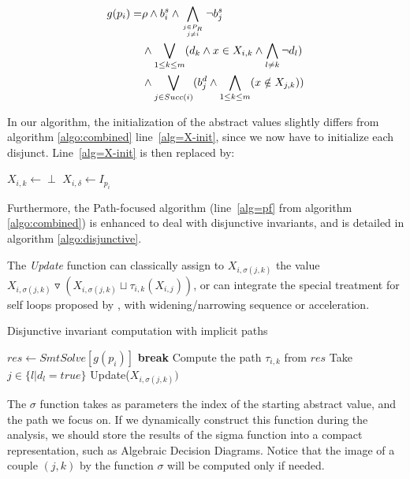 \documentclass[preprint]{sigplanconf}
\newcommand{\widening}{\mathop{\triangledown}}
\begin{document}
\begin{eqnarray*}
g(p_i) = & \rho \wedge b_i^s \wedge 
\displaystyle\bigwedge_{j \in P_R \atop j \neq i} \neg b_j^s  \\
 & \wedge 
\displaystyle\bigvee_{1 \leq k \leq m} (d_k \wedge x \in X_{i,k} \wedge \bigwedge_{l \neq k}
\neg d_l) \\
 & \wedge
\displaystyle\bigvee_{j \in Succ(i)} 
(b_j^d \wedge \bigwedge_{1 \leq k \leq m} (x \notin X_{j,k}))
\end{eqnarray*}

In our algorithm, the initialization of the abstract values slightly differs from
algorithm \ref{algo:combined} line~\ref{alg=X-init}, since we now have to
initialize each disjunct. Line~\ref{alg=X-init} is then replaced by:
\begin{algorithm}[!h]
\begin{algorithmic}[1] 
	\STATE $X_{i,k} \gets \perp$
\ENDFOR
\STATE $X_{i,\delta} \gets I_{p_i}$
\end{algorithmic}
\end{algorithm}

Furthermore, the Path-focused algorithm (line~\ref{alg=pf} from algorithm
\ref{algo:combined}) is enhanced to deal with disjunctive invariants, and
is detailed in algorithm \ref{algo:disjunctive}.

The \emph{Update} function can classically assign to $X_{i,\sigma(j,k)}$ the
value $X_{i,\sigma(j,k)} \widening (X_{i,\sigma(j,k)} \sqcup
\tau_{i,k}(X_{i,j}))$, or can integrate the special treatment for self loops
proposed by \citet{Monniaux_Gonnord_SAS11}, with widening/narrowing sequence or
acceleration.

\begin{algorithm}[!h]
\caption{Disjunctive invariant computation with implicit paths}\label{gulwani2}
\label{algo:disjunctive}
\begin{algorithmic}[1] 
		\STATE $res \gets SmtSolve\left[g(p_i)\right]$
		\STATE \textbf{break}
	\ENDIF
	\STATE Compute the path $\tau_{i,k}$ from $res$ 
	\STATE Take $j \in \{ l | d_l = true\}$ 
	\STATE Update($X_{i,\sigma(j,k)})$
\ENDWHILE
\end{algorithmic}
\end{algorithm}

The $\sigma$ function takes as parameters the index of the starting abstract
value, and the path we focus on. If we dynamically construct this function
during the analysis, we should store the results of the sigma function into a
compact representation, such as Algebraic Decision Diagrams. Notice that the
image of a couple $(j,k)$ by the function $\sigma$ will be computed only if
needed.
\end{document}
